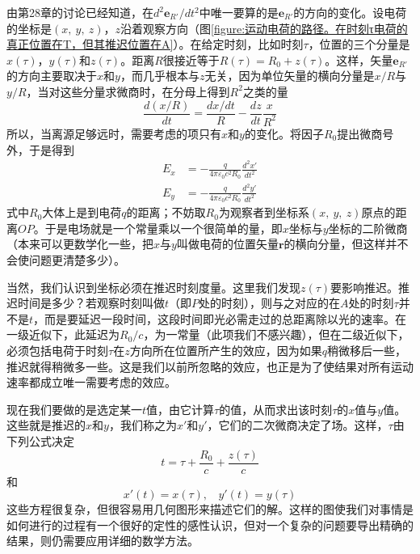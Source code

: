 由第28章的讨论已经知道，在$d^2\boldsymbol{e}_{R'}/dt^2$中唯一要算的是$\boldsymbol{e}_{R'}$的方向的变化。设电荷的坐标是$(x,~y,~z)$，$z$沿着观察方向（图\ref{figure:运动电荷的路径。在时刻τ电荷的真正位置在T，但其推迟位置在A}）。在给定时刻，比如时刻$\tau$，位置的三个分量是$x(\tau)$，$y(\tau)$和$z(\tau)$。距离$R$很接近等于$R(\tau)=R_0+z(\tau)$。这样，矢量$\boldsymbol{e}_{R'}$的方向主要取决于$x$和$y$，而几乎根本与$z$无关，因为单位矢量的横向分量是$x/R$与$y/R$，当对这些分量求微商时，在分母上得到$R^2$之类的量
\begin{equation*}
    \frac{d(x/R)}{dt} = \frac{dx/dt}{R} - \frac{dz}{dt}\frac{x}{R^2}
\end{equation*}
所以，当离源足够远时，需要考虑的项只有$x$和$y$的变化。将因子$R_0$提出微商号外，于是得到
\begin{equation}
    \label{Eq:I:34:3}
    \begin{aligned}
        E_x &= -\frac{q}{4\pi\varepsilon_0c^2R_0}\frac{d^2x'}{dt^2} \\
        E_y &= -\frac{q}{4\pi\varepsilon_0c^2R_0}\frac{d^2y'}{dt^2}
    \end{aligned}
\end{equation}
式中$R_0$大体上是到电荷$q$的距离；不妨取$R_0$为观察者到坐标系$(x,~y,~z)$原点的距离$OP$。于是电场就是一个常量乘以一个很简单的量，即$x$坐标与$y$坐标的二阶微商（本来可以更数学化一些，把$x$与$y$叫做电荷的位置矢量$\boldsymbol{r}$的横向分量，但这样并不会使问题更清楚多少）。

当然，我们认识到坐标必须在推迟时刻度量。这里我们发现$z(\tau)$要影响推迟。推迟时间是多少？若观察时刻叫做$t$（即$P$处的时刻），则与之对应的在$A$处的时刻$\tau$并不是$t$，而是要延迟一段时间，这段时间即光必需走过的总距离除以光的速率。在一级近似下，此延迟为$R_0/c$，为一常量（此项我们不感兴趣），但在二级近似下，必须包括电荷于时刻$\tau$在$z$方向所在位置所产生的效应，因为如果$q$稍微移后一些，推迟就得稍微多一些。这是我们以前所忽略的效应，也正是为了使结果对所有运动速率都成立唯一需要考虑的效应。

现在我们要做的是选定某一$t$值，由它计算$\tau$的值，从而求出该时刻$\tau$的$x$值与$y$值。这些就是推迟的$x$和$y$，我们称之为$x'$和$y'$，它们的二次微商决定了场。这样，$\tau$由下列公式决定
\begin{equation*}
    t = \tau + \frac{R_0}{c} + \frac{z(\tau)}{c}
\end{equation*}
和
\begin{equation}
    \label{Eq:I:34:4}
    x'(t) = x(\tau), ~~~~ y'(t) = y(\tau)
\end{equation}
这些方程很复杂，但很容易用几何图形来描述它们的解。这样的图使我们对事情是如何进行的过程有一个很好的定性的感性认识，但对一个复杂的问题要导出精确的结果，则仍需要应用详细的数学方法。

